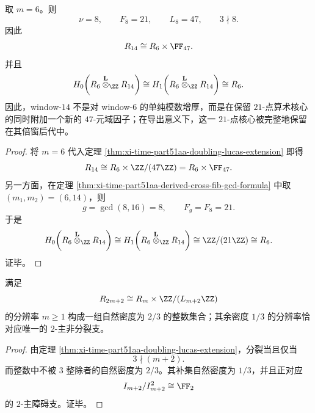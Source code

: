 \begin{corollary}\label{cor:xi-time-part51aa-window14-strict-direct-factor-lift}
取 \(m=6\)。则
\[
\nu=8,
\qquad
F_8=21,
\qquad
L_8=47,
\qquad
3\nmid 8.
\]
因此
\[
R_{14}\cong R_6\times \FF_{47}.
\]
并且
\[
H_0\!\left(R_6\overset{\mathbf L}{\otimes}_{\ZZ}R_{14}\right)
\cong
H_1\!\left(R_6\overset{\mathbf L}{\otimes}_{\ZZ}R_{14}\right)
\cong
R_6.
\]
因此，window-\(14\) 不是对 window-\(6\) 的单纯模数增厚，而是在保留 \(21\)-点算术核心的同时附加一个新的 \(47\)-元域因子；在导出意义下，这一 \(21\)-点核心被完整地保留在其倍窗后代中。
\end{corollary}
\begin{proof}
将 \(m=6\) 代入定理 \ref{thm:xi-time-part51aa-doubling-lucas-extension} 即得
\[
R_{14}\cong R_6\times \ZZ/(47\ZZ)=R_6\times \FF_{47}.
\]
另一方面，在定理 \ref{thm:xi-time-part51aa-derived-cross-fib-gcd-formula} 中取 \((m_1,m_2)=(6,14)\)，则
\[
g=\gcd(8,16)=8,
\qquad
F_g=F_8=21.
\]
于是
\[
H_0\!\left(R_6\overset{\mathbf L}{\otimes}_{\ZZ}R_{14}\right)
\cong
H_1\!\left(R_6\overset{\mathbf L}{\otimes}_{\ZZ}R_{14}\right)
\cong
\ZZ/(21\ZZ)
\cong
R_6.
\]
证毕。
\end{proof}

\begin{proposition}[倍窗分裂的自然密度]\label{prop:xi-time-part51aa-doubling-split-density}
满足
\[
R_{2m+2}\cong R_m\times \ZZ/(L_{m+2}\ZZ)
\]
的分辨率 \(m\ge 1\) 构成一组自然密度为 \(2/3\) 的整数集合；其余密度 \(1/3\) 的分辨率恰对应唯一的 \(2\)-主非分裂支。
\end{proposition}
\begin{proof}
由定理 \ref{thm:xi-time-part51aa-doubling-lucas-extension}，分裂当且仅当
\[
3\nmid (m+2).
\]
而整数中不被 \(3\) 整除者的自然密度为 \(2/3\)。其补集自然密度为 \(1/3\)，并且正对应
\[
I_{m+2}/I_{m+2}^2\cong \FF_2
\]
的 \(2\)-主障碍支。证毕。
\end{proof}

